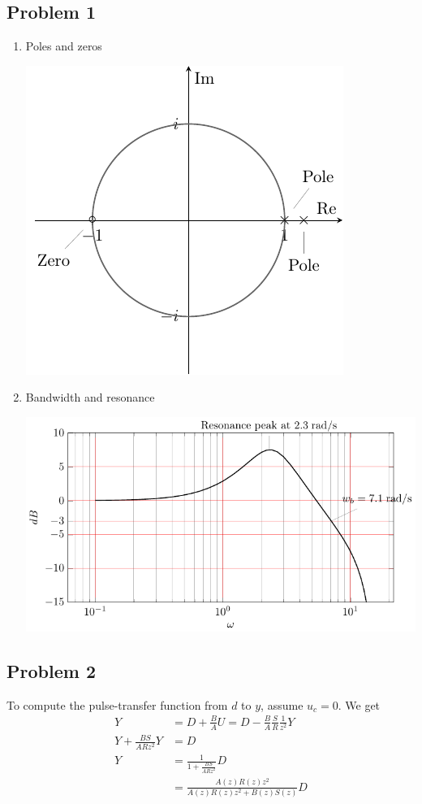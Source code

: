 \documentclass{scrartcl}
\begin{document}
\subsection*{Problem 1}
\label{sec:orgheadline5}
\begin{enumerate}
\item Poles and zeros
\begin{center}
\includegraphics[]{complex-plane-sol-final}
\end{center}
\item Bandwidth and resonance
\begin{center}
\includegraphics[]{bode-closed-sol}
\end{center}
\end{enumerate}

\subsection*{Problem 2}
\label{sec:orgheadline6}
To compute the pulse-transfer function from \(d\) to \(y\), assume \(u_c=0\). We get
\begin{equation*}
\begin{split}
Y &= D + \frac{B}{A} U = D - \frac{B}{A}\frac{S}{R}\frac{1}{z^2} Y\\
Y + \frac{BS}{ARz^2} Y &= D\\
Y &= \frac{1}{1 + \frac{BS}{ARz^2}} D\\
 &= \frac{A(z)R(z)z^2}{A(z)R(z)z^2 + B(z)S(z)} D
\end{split}
\end{equation*}
\end{document}
